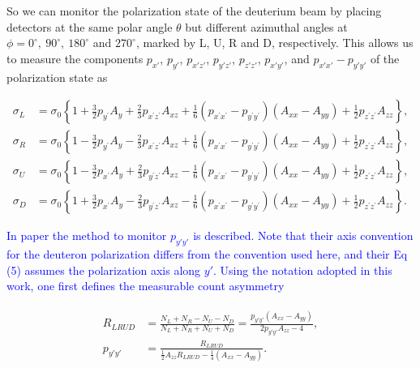 \documentclass[twocolumn,twoside,showpacs,showkeys,preprintnumbers,superscriptaddress,amsmath,amssymb,prc,nofootinbib,a4paper]{revtex4}
\begin{document}
So we can monitor the polarization state of the deuterium beam by placing detectors at the same polar angle $\theta$ but different azimuthal angles at $\phi=0^\circ,~90^\circ,~180^\circ$ and $270^\circ$, marked by L, U, R and D, respectively.  This allows us to measure the components $p_{x'}$, $p_{y'}$, $p_{x'z'}$, $p_{y'z'}$, $p_{z'z'}$, $p_{x'y'}$, and $p_{x'x'}-p_{y'y'}$ of the polarization state as
\begin{widetext}
	\begin{equation}
		\begin{aligned}
			\sigma_L&=\sigma_0\left\{1+\frac{3}{2} p_{y^{\prime}} A_y+\frac{2}{3} p_{x^{\prime} z^{\prime}} A_{x z}+\frac{1}{6}\left(p_{x^{\prime} x^{\prime}}-p_{y^{\prime} y^{\prime}}\right)\left(A_{x x}-A_{y y}\right)+\frac{1}{2} p_{z^{\prime} z^{\prime}} A_{z z}\right\}, %
			\\ 
			\sigma_R&=\sigma_0\left\{1-\frac{3}{2} p_{y^{\prime}} A_y-\frac{2}{3} p_{x^{\prime} z^{\prime}} A_{x z}+\frac{1}{6}\left(p_{x^{\prime} x^{\prime}}-p_{y^{\prime} y^{\prime}}\right)\left(A_{x x}-A_{y y}\right) +  \frac{1}{2} p_{z^{\prime} z^{\prime}} A_{z z}\right\}, %
			\\ 
			\sigma_U&=\sigma_0\left\{1-\frac{3}{2} p_{x^{\prime}} A_y+\frac{2}{3} p_{y^{\prime} z^{\prime}} A_{x z}-\frac{1}{6}\left(p_{x^{\prime} x^{\prime}}-p_{y^{\prime} y^{\prime}}\right)\left(A_{x x}-A_{y y}\right)+  \frac{1}{2} p_{z^{\prime} z^{\prime}} A_{z z}\right\} ,%
			\\ 
			\sigma_D&=\sigma_0\left\{1+\frac{3}{2} p_{x^{\prime}} A_y-\frac{2}{3} p_{y^{\prime} z^{\prime}} A_{x z}-\frac{1}{6}\left(p_{x^{\prime} x^{\prime}}-p_{y^{\prime} y^{\prime}}\right)\left(A_{x x}-A_{y y}\right)+  \frac{1}{2} p_{z^{\prime} z^{\prime}} A_{z z}\right\}.%
		\end{aligned} 
		\label{pzz-eqs}
	\end{equation}
\end{widetext}    


    \textcolor{blue}{In paper \cite{bieber2001performance} the method to monitor $p_{y'y'}$ is described. Note that their axis convention for the deuteron polarization differs from the convention used here, and their Eq (5) assumes the polarization axis along $y'$. Using the notation adopted in this work, one first defines the measurable count asymmetry}

\begin{align}
\begin{aligned}
     R_{LRUD} &= \frac{N_L+N_R-N_U-N_D}{N_L+N_R+N_U+N_D}= \frac{p_{y'y'}(A_{xx}-A_{yy})}{2p_{y'y'}A_{zz}-4}, \\ 
     p_{y'y'} &= \frac{R_{LRUD}}{\frac{1}{2} A_{zz} R_{LRUD}-\frac{1}{4}(A_{xx}-A_{yy})} .\label{pyy} 
    \end{aligned}
\end{align}
\end{document}
